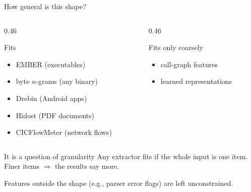 \documentclass[aspectratio=169,11pt]{beamer}
\begin{document}
\begin{frame}{How general is this shape?}
  \begin{columns}[T]
    \begin{column}{0.46\textwidth}
      \begin{exampleblock}{Fits}
        \begin{itemize}
          \item EMBER (executables)
          \item byte $n$-grams (any binary)
          \item Drebin (Android apps)
          \item Hidost (PDF documents)
          \item CICFlowMeter (network flows)
        \end{itemize}
      \end{exampleblock}
    \end{column}
    \begin{column}{0.46\textwidth}
      \begin{alertblock}{Fits only coarsely}
        \begin{itemize}
          \item call-graph features
          \item learned representations
        \end{itemize}
      \end{alertblock}
    \end{column}
  \end{columns}
  \vfill
  \begin{block}{It is a question of granularity}
    Any extractor fits if the whole input is one item.\\
    Finer items $\Rightarrow$ the results say more.
  \end{block}
  \vfill
  \begin{center}
    Features outside the shape (e.g., parser error flags) are left unconstrained.
  \end{center}
\end{frame}


\end{document}
